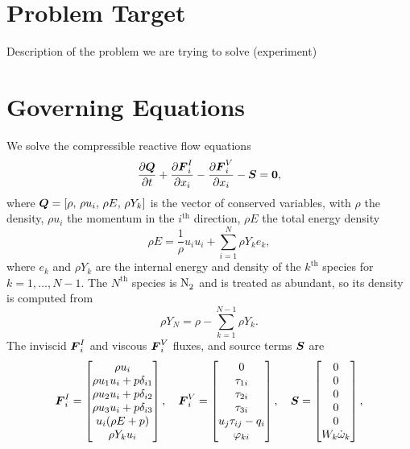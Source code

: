 \documentclass{article}
\begin{document}
  
\section{Problem Target}\label{sec:experiment}
  
  Description of the problem we are trying to solve (experiment)
  
\section{Governing Equations}\label{subsec:gov_equations}

We solve the compressible reactive flow equations
\begin{equation}\label{eq:gov_eqns}
  \frac{\partial\boldsymbol{Q}}{\partial t} + \frac{\partial\boldsymbol{F}_{i}^{I}}{\partial x_{i}} - \frac{\partial\boldsymbol{F}_{i}^{V}}{\partial x_{i}} - \boldsymbol{S} = \boldsymbol{0},
\end{equation}
where $\boldsymbol{Q} = [ \rho,\, \rho u_{i},\, \rho E,\, \rho Y_{k} ]$ is the vector of conserved variables, with $\rho$ the density, $\rho u_{i}$ the momentum in the $i^{\mathrm{th}}$ direction, $\rho E$ the total energy density
\begin{equation}
  \rho E = \frac{1}\rho u_{i}u_{i} + \sum_{i = 1}^{N}\rho Y_{k} e_{k},
\end{equation}
where $e_{k}$ and $\rho Y_{k}$ are the internal energy and density of the $k^{\mathrm{th}}$ species for $k = 1,\dots,N-1$. The $N^{\mathrm{th}}$ species is $\ce{N2}$ and is treated as abundant, so its density is computed from
\begin{equation}\label{eq:mass_abund}
  \rho Y_{N} = \rho - \sum_{k = 1}^{N-1}\rho Y_{k}.
\end{equation}
The inviscid $\boldsymbol{F}_{i}^{I}$ and viscous $\boldsymbol{F}_{i}^{V}$ fluxes, and source terms $\boldsymbol{S}$ are
\begin{equation}\label{eq:fluxes}
  \boldsymbol{F}_{i}^{I} = \begin{bmatrix}
    \rho u_{i} \\
    \rho u_{1}u_{i} + p \delta_{i1} \\
    \rho u_{2}u_{i} + p \delta_{i2} \\
    \rho u_{3}u_{i} + p \delta_{i3} \\
    u_{i}( \rho E + p ) \\
    \rho Y_{k} u_{i}
  \end{bmatrix},\quad
  \boldsymbol{F}_{i}^{V} = \begin{bmatrix}
    0 \\
    \tau_{1i} \\
    \tau_{2i} \\
    \tau_{3i} \\
    u_{j}\tau_{ij} - q_{i} \\
    \varphi_{ki}
  \end{bmatrix},\quad
  \boldsymbol{S} = \begin{bmatrix}
    0 \\
    0 \\
    0 \\
    0 \\
    0 \\
    W_{k}\dot{\omega}_{k}
  \end{bmatrix},
\end{equation}
\end{document}
